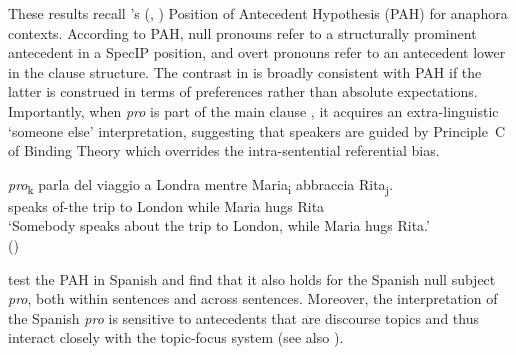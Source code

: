 \documentclass[output=paper,colorlinks,citecolor=brown]{langscibook}
\begin{document}
\ea \label{ste-pav:ex:mentre-parla-viaggio}
 \label{ste-pav:ex:mentre-parla-viaggio-a}
 \label{ste-pav:ex:mentre-parla-viaggio-b}
\z
\z

\noindent These results recall \citeauthor{carminati2002}'s (\citeyear{carminati2002}, \citeyear{carminati2005}) Position of Antecedent Hypothesis (PAH) for anaphora contexts. According to PAH, null pronouns refer to a structurally prominent antecedent in a SpecIP position, and overt pronouns refer to an antecedent lower in the clause structure. The contrast in  is broadly consistent with PAH if the latter is construed in terms of preferences rather than absolute expectations. Importantly, when \textit{pro} is part of the main clause , it acquires an extra-linguistic ‘someone else’ interpretation, suggesting that speakers are guided by Principle~C of Binding Theory which overrides the intra-sentential referential bias.

\ea\label{ste-pav:ex:pro-parla-viaggio}
\gll \textit{pro}\textsubscript{k}	parla	del	viaggio	a	Londra	mentre	Maria\textsubscript{i}	abbraccia	Rita\textsubscript{j}.\\
{}	speaks	of-the	trip	to	London	while	Maria	hugs	Rita \\
\glt ‘Somebody speaks about the trip to London, while Maria hugs Rita.’ \\ \hfill (\citealt{fedele2014})
\z

\noindent \citet{alonso2002} test the PAH in Spanish and find that it also holds for the Spanish null subject \textit{pro}, both within sentences and across sentences. Moreover, the interpretation of the Spanish \textit{pro} is sensitive to antecedents that are discourse topics and thus interact closely with the topic-focus system (see also \citealt{yulong2007, zhiyi2019}).
\end{document}
